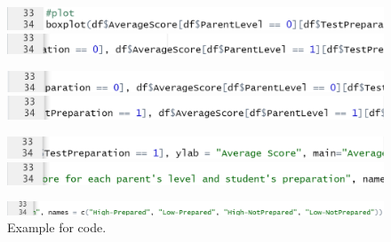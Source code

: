 \documentclass[a4paper]{article}
\begin{document}
\begin{figure}[H]
    \centering
    \begin{minipage}{0.5\textwidth}
        \centering
        \includegraphics[width = 1\linewidth]{Images/Activity2/12.png}
    \end{minipage}%
    \begin{minipage}{0.5\textwidth}
        \centering
        \includegraphics[width = 1\linewidth]{Images/Activity2/13.png}
    \end{minipage}
\end{figure}
\begin{figure}[H]    
    \begin{minipage}{0.5\textwidth}
        \centering
        \includegraphics[width = 1\linewidth]{Images/Activity2/14.png}
    \end{minipage}%
    \begin{minipage}{0.5\textwidth}
        \centering
        \includegraphics[width = 1\linewidth]{Images/Activity2/15.png}
    \end{minipage}
\end{figure}
\begin{figure}[H]   
    \begin{minipage}{0.5\textwidth}
        \centering
        \includegraphics[width = 1\linewidth]{Images/Activity2/16.png}
    \end{minipage}%
    \begin{minipage}{0.5\textwidth}
        \centering
        \includegraphics[width = 1\linewidth]{Images/Activity2/17.png}
    \end{minipage}
\end{figure}
\begin{figure}[H]
    \centering
    \includegraphics[width = 0.7\linewidth]{Images/Activity2/18.png}
    \caption{Example for code.}
    \label{fig:trans5}
\end{figure}
\end{document}

